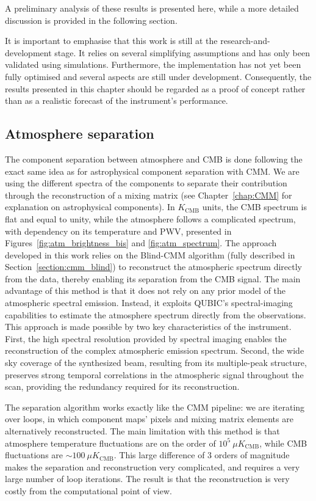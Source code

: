 \documentclass[../../thesis.tex]{subfiles}
\begin{document}
A preliminary analysis of these results is presented here, while a more detailed discussion is provided in the following section.

It is important to emphasise that this work is still at the research-and-development stage. It relies on several simplifying assumptions and has only been validated using simulations. Furthermore, the implementation has not yet been fully optimised and several aspects are still under development. Consequently, the results presented in this chapter should be regarded as a proof of concept rather than as a realistic forecast of the instrument's performance.

\subsection{Atmosphere separation}

The component separation between atmosphere and CMB is done following the exact same idea as for astrophysical component separation with CMM. We are using the different spectra of the components to separate their contribution through the reconstruction of a mixing matrix (see Chapter~\ref{chap:CMM} for explanation on astrophysical components). In $K_\text{CMB}$ units, the CMB spectrum is flat and equal to unity, while the atmosphere follows a complicated spectrum, with dependency on its temperature and PWV, presented in Figures~\ref{fig:atm_brightness_bis} and \ref{fig:atm_spectrum}.
The approach developed in this work relies on the Blind-CMM algorithm (fully described in Section~\ref{section:cmm_blind}) to reconstruct the atmospheric spectrum directly from the data, thereby enabling its separation from the CMB signal. The main advantage of this method is that it does not rely on any prior model of the atmospheric spectral emission. Instead, it exploits QUBIC's spectral-imaging capabilities to estimate the atmosphere spectrum directly from the observations. This approach is made possible by two key characteristics of the instrument. First, the high spectral resolution provided by spectral imaging enables the reconstruction of the complex atmospheric emission spectrum. Second, the wide sky coverage of the synthesized beam, resulting from its multiple-peak structure, preserves strong temporal correlations in the atmospheric signal throughout the scan, providing the redundancy required for its reconstruction.

The separation algorithm works exactly like the CMM pipeline: we are iterating over loops, in which component maps' pixels and mixing matrix elements are alternatively reconstructed. The main limitation with this method is that atmosphere temperature fluctuations are on the order of $10^{5}~\mu K_\text{CMB}$, while CMB fluctuations are $\sim 100~\mu K_\text{CMB}$. This large difference of $3$ orders of magnitude makes the separation and reconstruction very complicated, and requires a very large number of loop iterations. The result is that the reconstruction is very costly from the computational point of view.
\end{document}
